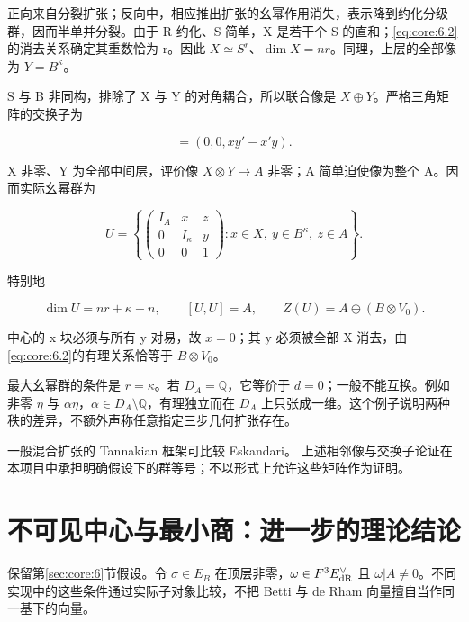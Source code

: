 \documentclass[11pt,a4paper,oneside]{ctexrep}
\theoremstyle{cnplain}
\theoremstyle{definition}
\theoremstyle{remark}
\begin{document}
正向来自分裂扩张；反向中，相应推出扩张的幺幂作用消失，表示降到约化分级群，因而半单并分裂。由于 R 约化、S 简单，X 是若干个 S 的直和；\eqref{eq:core:6.2}的消去关系确定其重数恰为 r。因此 \(X\simeq S^r\)、\(\dim X=nr\)。同理，上层的全部像为 \(Y=B^\kappa\)。

S 与 B 非同构，排除了 X 与 Y 的对角耦合，所以联合像是 \(X\oplus Y\)。严格三角矩阵的交换子为

\begin{equation}
[(x,y,z),(x',y',z')]=(0,0,xy'-x'y).                     \label{eq:core:6.3}
\end{equation}

X 非零、Y 为全部中间层，评价像 \(X\otimes Y\to A\) 非零；A 简单迫使像为整个 A。因而实际幺幂群为

\begin{equation}
U=\left\{\begin{pmatrix}I_A&x&z\\0&I_\kappa&y\\0&0&1\end{pmatrix}
           :x\in X,\ y\in B^\kappa,\ z\in A\right\}.    \label{eq:core:6.4}
\end{equation}

特别地

\begin{equation}
\dim U=nr+\kappa+n,\qquad [U,U]=A,\qquad
 Z(U)=A\oplus(B\otimes V_0).                            \label{eq:core:6.5}
\end{equation}

中心的 x 块必须与所有 y 对易，故 \(x=0\)；其 y 必须被全部 X 消去，由\eqref{eq:core:6.2}的有理关系恰等于 \(B\otimes V_{0}\)。

最大幺幂群的条件是 \(r=\kappa \)。若 \(D_A=\mathbb Q\)，它等价于 \(d=0\)；一般不能互换。例如非零 \(\eta \) 与 \(\alpha\eta\)，\(\alpha\in D_A\setminus\mathbb Q\)，有理独立而在 \(D_A\) 上只张成一维。这个例子说明两种秩的差异，不额外声称任意指定三步几何扩张存在。

一般混合扩张的 Tannakian 框架可比较 Eskandari。\cite{eskandari} 上述相邻像与交换子论证在本项目中承担明确假设下的群等号；不以形式上允许这些矩阵作为证明。

\section{不可见中心与最小商：进一步的理论结论}\label{sec:core:7}

保留第\ref{sec:core:6}节假设。令 \(\sigma \in E_B\) 在顶层非零，\(\omega\in F^3E_{\rm dR}^\vee\) 且 \(\omega|A\ne0\)。不同实现中的这些条件通过实际子对象比较，不把 Betti 与 de Rham 向量擅自当作同一基下的向量。
\end{document}
